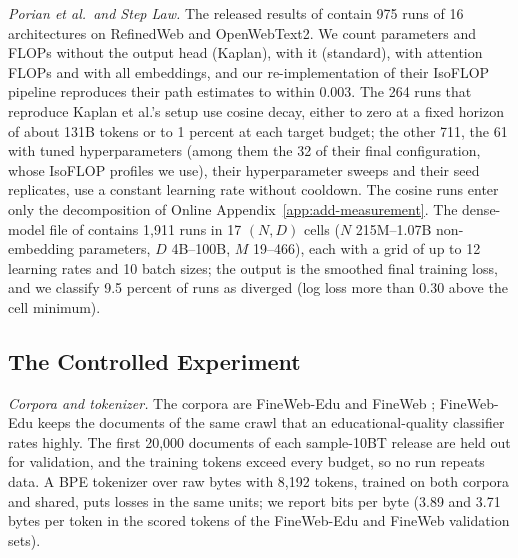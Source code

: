 \textit{Porian et al.\ and Step Law.} The released results of \citet{porian2024resolving} contain 975 runs of 16
architectures on RefinedWeb and OpenWebText2. We count parameters and FLOPs without the output head (Kaplan), with it
(standard), with attention FLOPs and with all embeddings, and our re-implementation of their IsoFLOP pipeline reproduces
their path estimates to within 0.003. The 264 runs that reproduce Kaplan et al.'s setup use cosine decay, either to zero
at a fixed horizon of about 131B tokens or to 1 percent at each target budget; the other 711, the 61 with tuned
hyperparameters (among them the 32 of their final configuration, whose IsoFLOP profiles we use), their hyperparameter
sweeps and their seed replicates, use a constant learning rate without cooldown. The cosine runs enter only the decomposition of Online
Appendix~\ref{app:add-measurement}. The dense-model file of \citet{li2025predictablea}
contains 1,911 runs in 17 $(N,D)$ cells ($N$ 215M--1.07B non-embedding parameters, $D$ 4B--100B, $M$ 19--466), each with a
grid of up to 12 learning rates and 10 batch sizes; the output is the smoothed final training loss, and we classify 9.5
percent of runs as diverged (log loss more than 0.30 above the cell minimum).

\subsection{The Controlled Experiment}\label{app:sweep}

\textit{Corpora and tokenizer.} The corpora are FineWeb-Edu and FineWeb \citep{penedo2024fineweb}; FineWeb-Edu keeps the
documents of the same crawl that an educational-quality classifier rates highly. The first 20,000 documents of each
sample-10BT release are held out for validation, and the training tokens exceed every budget, so no run repeats data. A
BPE tokenizer \citep{sennrich2016neural} over raw bytes with 8,192 tokens, trained on both corpora and shared, puts
losses in the same units; we report bits per byte (3.89 and 3.71 bytes per token in the scored tokens of the FineWeb-Edu
and FineWeb validation sets).

